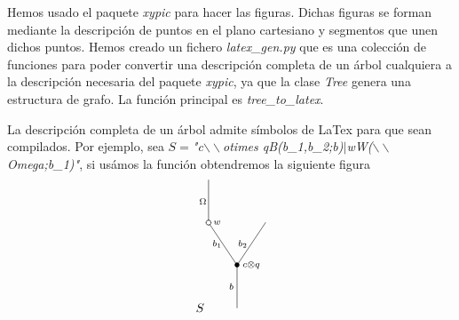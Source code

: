 \documentclass[../main.tex]{subfiles}
\begin{document}
Hemos usado el paquete \emph{xypic} para hacer las figuras. Dichas figuras se forman mediante la descripci\'on de puntos en el plano cartesiano y segmentos que unen dichos puntos. Hemos creado un fichero \emph{latex\_gen.py} que es una colecci\'on de funciones para poder convertir una descripci\'on completa de un \'arbol cualquiera a la descripci\'on necesaria del paquete \emph{xypic}, ya que la clase \emph{Tree} genera una estructura de grafo.
La funci\'on principal es \emph{tree\_to\_latex}.

La descripci\'on completa de un \'arbol admite s\'imbolos de LaTex para que sean compilados. Por ejemplo, sea $S=$\emph{"c$\backslash\backslash$otimes qB(b\_1,b\_2;b)$|$wW($\backslash\backslash$Omega;b\_1)"}, si us\'amos la funci\'on obtendremos la siguiente figura
$$
    \xy
    <0.08cm, 0cm>:
    (0.0, 0.0)*{}="1"; %
    (0.0, 15.0)*=0{\bullet}="2"; %
    (-10.0, 30.0)*\cir<2pt>{}="3"; %
    (-10.0, 45.0)*{}="4"; %
    (10.0, 30.0)*{}="5"; %
    "1";"2" **\dir{-};
    "2";"3" **\dir{-};
    "3";"4" **\dir{-};
    "2";"5" **\dir{-};
    (5.0, 15.0)*=0{\scriptstyle c\otimes q};
    (-7.0, 30.0)*=0{\scriptstyle w};
    (-2.0, 7.5)*=0{\scriptstyle b};
    (-7.0, 22.5)*=0{\scriptstyle b_1};
    (-12.0, 37.5)*=0{\scriptstyle \Omega};
    (2, 22.5)*=0{\scriptstyle b_2};
    (-13,0)*{S};
    \endxy
$$
\end{document}
